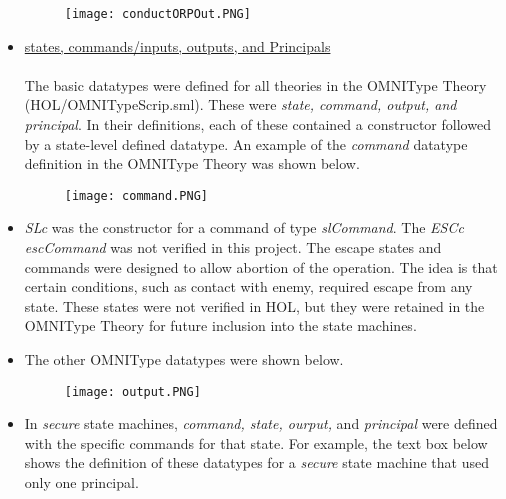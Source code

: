 \begin{itemize}
  \begin{figure}[h]
  \centering
  \texttt{[image: conductORPOut.PNG]}
\end{figure}
\item \underline{states, commands/inputs, outputs, and Principals}\\\\
  The basic datatypes were defined for all theories in the OMNIType Theory (HOL/OMNITypeScrip.sml).
  These were \textit{state, command, output, and principal}.   In their definitions, each of these
  contained a constructor followed by a state-level defined datatype.   An example of the
  \textit{command} datatype definition in the OMNIType Theory was shown below.
  \begin{figure}[h]
  \centering
  \texttt{[image: command.PNG]}
\end{figure}
\item \textit{SLc} was the constructor for a command of type \textit{slCommand}.  The \textit{ESCc escCommand}
  was not verified in this project.  The escape states and commands were designed to allow abortion of the
  operation.  The idea is that certain conditions, such as contact with enemy, required escape from any state.
  These states were not verified in HOL, but they were retained in the OMNIType Theory for future inclusion
  into the state machines.
\item The other OMNIType datatypes were shown below.
  \begin{figure}[h]
  \centering
  \texttt{[image: output.PNG]}
\end{figure}
\item In \textit{secure} state machines, \textit{command, state, ourput,} and \textit{principal}
  were defined with the specific commands for that state.  For example, the text box below shows
  the definition of these datatypes for a \textit{secure} state machine that used only one principal.\\\\\\\\\\\\\\\\\\\\
  \\\\\\\\\\

\end{itemize}
